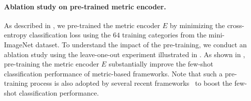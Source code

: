 \paragraph{Ablation study on pre-trained metric encoder.}
As described in , we pre-trained the metric encoder $E$ by minimizing the cross-entropy classification loss using the $64$ training categories from the mini-ImageNet dataset.
To understand the impact of the pre-training, we conduct an ablation study using the leave-one-out experiment illustrated in .
As shown in , pre-training the metric encoder $E$ substantially improve the few-shot classification performance of metric-based frameworks.
Note that such a pre-training process is also adopted by several recent frameworks~\citep{rusu2018leo,gidaris2018dynamic,lifchitz2019dense} to boost the few-shot classification performance.
